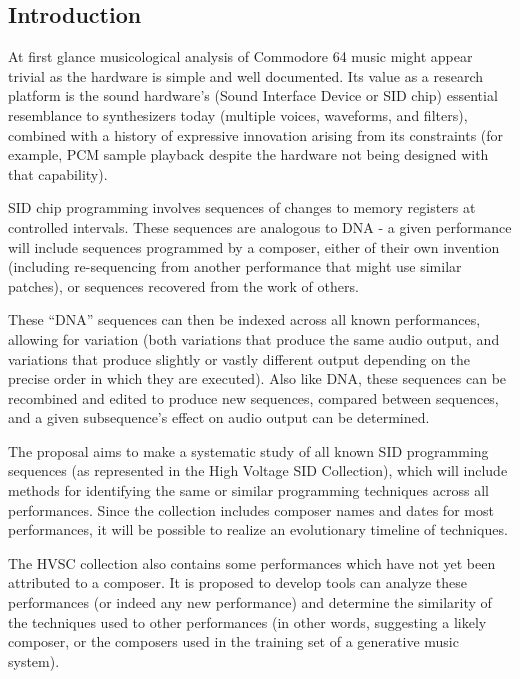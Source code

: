 \documentclass[10pt]{article}
\begin{document}
\begin{multicols*}{2}

  \section{Introduction}
  At first glance musicological analysis of Commodore 64 music might
  appear trivial as the hardware is simple and well documented. Its
  value as a research platform is the sound hardware's (Sound
  Interface Device or SID chip) essential resemblance to synthesizers
  today (multiple voices, waveforms, and filters), combined with a
  history of expressive innovation arising from its constraints (for
  example, PCM sample playback despite the hardware not being designed
  with that capability).

  SID chip programming involves sequences of changes to memory
  registers at controlled intervals. These sequences are analogous to
  DNA - a given performance will include sequences programmed by a
  composer, either of their own invention (including re-sequencing
  from another performance that might use similar patches), or
  sequences recovered from the work of others.

  These ``DNA'' sequences can then be indexed across all known
  performances, allowing for variation (both variations that produce
  the same audio output, and variations that produce slightly or
  vastly different output depending on the precise order in which they
  are executed). Also like DNA, these sequences can be recombined and
  edited to produce new sequences, compared between sequences, and a
  given subsequence's effect on audio output can be determined.

  The proposal aims to make a systematic study of all known SID
  programming sequences (as represented in the High Voltage SID
  Collection), which will include methods for identifying the same or
  similar programming techniques across all performances. Since the
  collection includes composer names and dates for most performances,
  it will be possible to realize an evolutionary timeline of
  techniques.

  The HVSC collection also contains some performances which have not
  yet been attributed to a composer. It is proposed to develop tools
  can analyze these performances (or indeed any new performance) and
  determine the similarity of the techniques used to other
  performances (in other words, suggesting a likely composer, or the
  composers used in the training set of a generative music system).


\end{multicols*}
\end{document}
